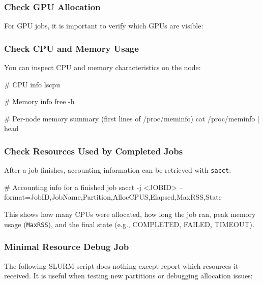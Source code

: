 \documentclass[11pt]{article}
\begin{document}
\subsubsection{Check GPU Allocation}

For GPU jobs, it is important to verify which GPUs are visible:


\subsubsection{Check CPU and Memory Usage}

You can inspect CPU and memory characteristics on the node:

\begin{codeblock}
# CPU info
lscpu

# Memory info
free -h

# Per-node memory summary (first lines of /proc/meminfo)
cat /proc/meminfo | head
\end{codeblock}

\subsubsection{Check Resources Used by Completed Jobs}

After a job finishes, accounting information can be retrieved with
\texttt{sacct}:

\begin{codeblock}
# Accounting info for a finished job
sacct -j <JOBID> --format=JobID,JobName,Partition,AllocCPUS,Elapsed,MaxRSS,State
\end{codeblock}

This shows how many CPUs were allocated, how long the job ran, peak memory
usage (\texttt{MaxRSS}), and the final state (e.g., COMPLETED, FAILED, TIMEOUT).

\subsubsection{Minimal Resource Debug Job}

The following SLURM script does nothing except report which resources it
received. It is useful when testing new partitions or debugging allocation
issues:
\end{document}
